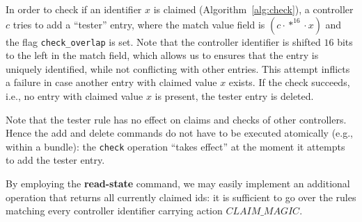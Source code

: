 \documentclass{sig-alternate-2006}
\newcommand{\concat}[0]{\cdot}
\newcommand{\claimcheck}{check\xspace}
\newcommand{\checko}{\texttt{check\_overlap}\xspace}
\newcommand{\claimmagic}{\textit{CLAIM\_MAGIC}}
\begin{document}
In order to check if an identifier $x$ is claimed
(Algorithm~\ref{alg:check}), a controller $c$ tries to add
a ``tester'' entry, where the match value field is 
$(c\concat*^{16}\concat x)$  and the flag \texttt{\checko} is set.
Note that the controller identifier is shifted $16$ bits to the left in
the match field, which allows us to ensures that the entry is uniquely
identified, while not conflicting with other entries.  
This attempt inflicts a failure in case another entry with claimed
value $x$ exists. 
If the check succeeds, i.e.,  no entry with claimed value $x$ is
present, the tester entry is deleted.   

Note that the tester rule has no effect on claims and checks of other
controllers. Hence the add and delete commands do not have to be
executed atomically (e.g., within a bundle): the \texttt{\claimcheck}
operation ``takes effect'' at the moment it attempts to add the tester entry.   

By employing the \textbf{read-state} command, we may easily implement
an additional operation that returns all currently claimed ids: it is
sufficient to go over the rules matching every controller identifier
carrying action $\claimmagic$.
\end{document}
